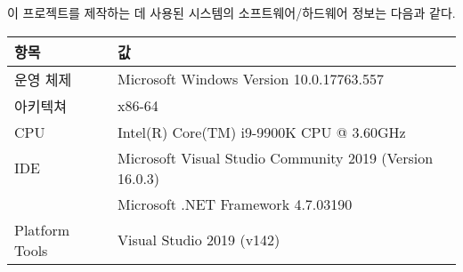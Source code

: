 이 프로젝트를 제작하는 데 사용된 시스템의 소프트웨어/하드웨어 정보는 다음과 같다.

\begin{tabularx}{\linewidth}{l|X}
    항목 & 값 \\
    \hline
    운영 체제 & Microsoft Windows Version 10.0.17763.557 \\
    아키텍쳐 & x86-64 \\
    CPU & Intel(R) Core(TM) i9-9900K CPU @ 3.60GHz \\
    \hline
    IDE & Microsoft Visual Studio Community 2019 (Version 16.0.3) \\
     & Microsoft .NET Framework 4.7.03190 \\
    Platform Tools & Visual Studio 2019 (v142) \\
\end{tabularx}